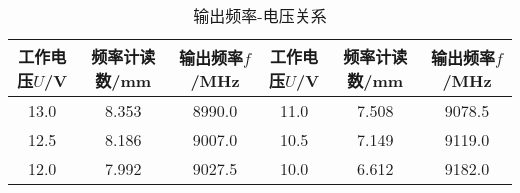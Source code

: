 \begin{table}[htbp!]
	\centering\small
	\caption{输出频率-电压关系}\label{tab:fV}	\begin{tabular}{c||c|c|c|c|c}
		\hline\hline
		工作电压$U$/V & 频率计读数/mm & 输出频率$f$/MHz & 工作电压$U$/V & 频率计读数/mm & 输出频率$f$/MHz\\		\hline\hline
		13.0 & 8.353 & 8990.0 & 11.0 & 7.508 & 9078.5\\		\hline
		12.5 & 8.186 & 9007.0 & 10.5 & 7.149 & 9119.0\\		\hline
		12.0 & 7.992 & 9027.5 & 10.0 & 6.612 & 9182.0\\		\hline\hline
	\end{tabular}
\end{table}
